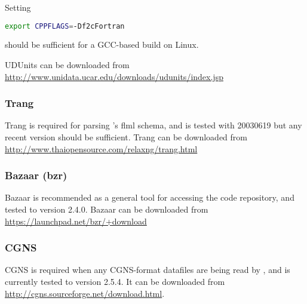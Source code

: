 Setting

\begin{lstlisting}[language=bash]
export CPPFLAGS=-Df2cFortran
\end{lstlisting}

should be sufficient for a GCC-based build on Linux.

UDUnits can be downloaded from \url{http://www.unidata.ucar.edu/downloads/udunits/index.jsp}

\subsubsection{Trang}
\label{sec:required_libraries_supporting_trang}

Trang is required for parsing \fluidity's flml schema, and is tested with
20030619 but any recent version should be sufficient. Trang can be downloaded
from \url{http://www.thaiopensource.com/relaxng/trang.html}

\subsubsection{Bazaar (bzr)}
\label{sec:required_libraries_supporting_bzr}

Bazaar is recommended as a general tool for accessing the \fluidity code
repository, and tested to version 2.4.0. Bazaar can be
downloaded from \url{https://launchpad.net/bzr/+download}

\subsubsection{CGNS}
\label{sec:required_libraries_supporting_cgns}

CGNS is required when any CGNS-format datafiles are being read by \fluidity, and
is currently tested to version 2.5.4. It can be downloaded from 
\url{http://cgns.sourceforge.net/download.html}.
